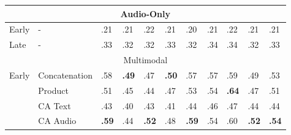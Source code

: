 \documentclass{article}
\begin{document}
\begin{table}[H]
\begin{tabular}{|lllllllllll|}
\multicolumn{11}{|c|}{Audio-Only}                                                                                                                                                                                                                                                                      \\ \hline
\multicolumn{1}{|l|}{Early}                  & \multicolumn{1}{l|}{-}             & .21                & .21                & .22                & .21                & .20                & .21                & .22                & \multicolumn{1}{l|}{.21}                & .21                   \\
\multicolumn{1}{|l|}{Late}                   & \multicolumn{1}{l|}{-}             & .33                & .32                & .32                & .33                & .32                & .34                & .34                & \multicolumn{1}{l|}{.32}                & .33                   \\ \hline
\multicolumn{11}{|c|}{Multimodal}                                                                                                                                                                                                                                                                      \\ \hline
\multicolumn{1}{|l|}{\multirow{4}{*}{Early}} & \multicolumn{1}{l|}{Concatenation} & .58                & \textbf{.49}       & .47                & \textbf{.50}       & .57                & .57                & .59                & \multicolumn{1}{l|}{.49}                & .53                   \\
\multicolumn{1}{|l|}{}                       & \multicolumn{1}{l|}{Product}       & .51                & .45                & .44                & .47                & .53                & .54                & \textbf{.64}       & \multicolumn{1}{l|}{.47}                & .51                   \\
\multicolumn{1}{|l|}{}                       & \multicolumn{1}{l|}{CA Text}       & .43                & .40                & .43                & .41                & .44                & .46                & .47                & \multicolumn{1}{l|}{.44}                & .44                   \\
\multicolumn{1}{|l|}{}                       & \multicolumn{1}{l|}{CA Audio}      & \textbf{.59}       & .44                & \textbf{.52}       & .48                & \textbf{.59}       & .54                & .60                & \multicolumn{1}{l|}{\textbf{.52}}       & \textbf{.54}          \\

\end{tabular}
\end{table}
\end{document}
